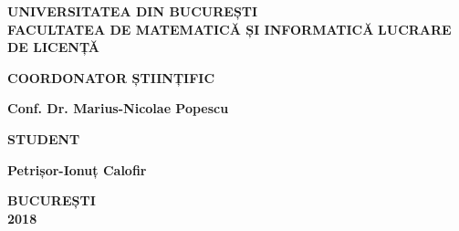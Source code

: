 \begin{titlepage}
	\begin{center}
		\vspace*{1cm}
		\normalsize
		\textbf{UNIVERSITATEA DIN BUCUREȘTI\\
				FACULTATEA DE MATEMATICĂ ȘI INFORMATICĂ}
		\vfill
		\huge
		\textbf{LUCRARE DE LICENȚĂ}
		\vfill
		\normalsize
		\begin{flushleft}
			\textbf{COORDONATOR ȘTIINȚIFIC}

			\textbf{Conf. Dr. Marius-Nicolae Popescu}
		\end{flushleft}

		\begin{flushright}
			\textbf{STUDENT}

			\textbf{Petrișor-Ionuț Calofir}
		\end{flushright}
		\vfill
		\normalsize
		\textbf{BUCUREȘTI\\
				2018}
	\end{center}
\end{titlepage}